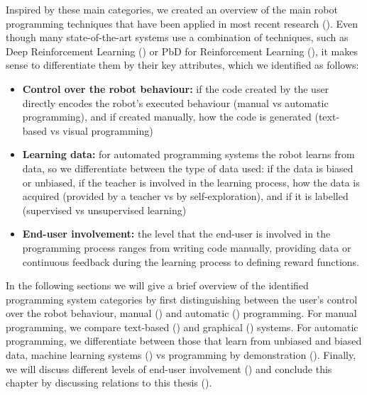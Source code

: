 Inspired by these main categories, we created an overview of the main robot programming techniques that have been applied in most recent research ().
Even though many state-of-the-art systems use a combination of techniques, such as Deep Reinforcement Learning (\cite{arulkumaran2017brief,mnih2015human}) or PbD for Reinforcement Learning (\cite{hester2017learning}), it makes sense to differentiate them by their key attributes, which we identified as follows: 
\begin{itemize}
	\item \textbf{Control over the robot behaviour:} if the code created by the user directly encodes the robot's executed behaviour (manual vs automatic programming), and if created manually, how the code is generated (text-based vs visual programming)
	\item \textbf{Learning data:} for automated programming systems the robot learns from data, so we differentiate between the type of data used: if the data is biased or unbiased, if the teacher is involved in the learning process, how the data is acquired (provided by a teacher vs by self-exploration), and if it is labelled (supervised vs unsupervised learning) %
	\item \textbf{End-user involvement:} the level that the end-user is involved in the programming process ranges from writing code manually, providing data or continuous feedback during the learning process to defining reward functions.
\end{itemize}

In the following sections we will give a brief overview of the identified programming system categories by first distinguishing between the user's control over the robot behaviour, \ie manual () and automatic () programming.
For manual programming, we compare text-based () and graphical () systems.
For automatic programming, we differentiate between those that learn from unbiased and biased data, \ie machine learning systems () vs programming by demonstration ().
Finally, we will discuss different levels of end-user involvement %
() and conclude this chapter by discussing relations to this thesis ().

